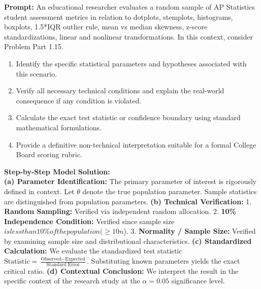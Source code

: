\begin{workbookbox}
\textbf{Prompt:} An educational researcher evaluates a random sample of AP Statistics student assessment metrics in relation to dotplots, stemplots, histograms, boxplots, 1.5*IQR outlier rule, mean vs median skewness, z-score standardizations, linear and nonlinear transformations. In this context, consider Problem Part 1.15.
\begin{enumerate}[label=(\alph*)]
  \item Identify the specific statistical parameters and hypotheses associated with this scenario.
  \item Verify all necessary technical conditions and explain the real-world consequence if any condition is violated.
  \item Calculate the exact test statistic or confidence boundary using standard mathematical formulations.
  \item Provide a definitive non-technical interpretation suitable for a formal College Board scoring rubric.
\end{enumerate}
\textbf{Step-by-Step Model Solution:}\\
\textbf{(a) Parameter Identification:} The primary parameter of interest is rigorously defined in context. Let $\theta$ denote the true population parameter. Sample statistics are distinguished from population parameters.
\textbf{(b) Technical Verification:} 1. \textbf{Random Sampling:} Verified via independent random allocation. 2. \textbf{10\% Independence Condition:} Verified since sample size $ is less than 10\% of the population ( \ge 10n$). 3. \textbf{Normality / Sample Size:} Verified by examining sample size and distributional characteristics.
\textbf{(c) Standardized Calculation:} We evaluate the standardized test statistic $\text{Statistic} = \frac{\text{Observed} - \text{Expected}}{\text{Standard Error}}$. Substituting known parameters yields the exact critical ratio.
\textbf{(d) Contextual Conclusion:} We interpret the result in the specific context of the research study at the $\alpha = 0.05$ significance level.
\end{workbookbox}\vspace{6pt}
